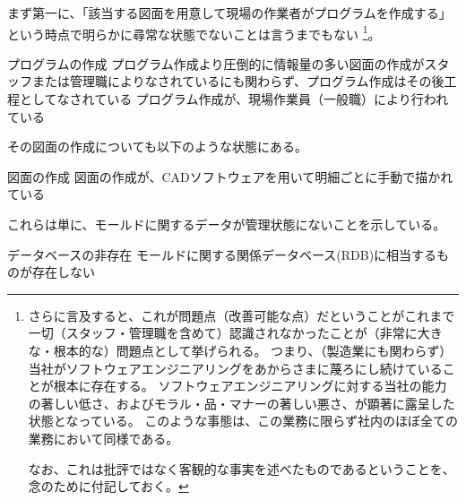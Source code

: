 まず第一に、「該当する図面を用意して現場の作業者がプログラムを作成する」という時点で明らかに尋常な状態でないことは言うまでもない
\footnote{さらに言及すると、これが問題点（改善可能な点）だということがこれまで一切（スタッフ・管理職を含めて）認識されなかったことが（非常に大きな・根本的な）問題点として挙げられる。
つまり、（製造業にも関わらず）当社がソフトウェアエンジニアリングをあからさまに蔑ろにし続けていることが根本に存在する。
ソフトウェアエンジニアリングに対する当社の能力の著しい低さ、およびモラル・品・マナーの著しい悪さ、が顕著に露呈した状態となっている。
このような事態は、この業務に限らず社内のほぼ全ての業務において同様である。

なお、これは批評ではなく客観的な事実を述べたものであるということを、念のために付記しておく。}。
\begin{Issues}{プログラムの作成}
プログラム作成より圧倒的に情報量の多い図面の作成がスタッフまたは管理職によりなされているにも関わらず、プログラム作成はその後工程としてなされている
\tcbline*
プログラム作成が、現場作業員（一般職）により行われている
\end{Issues}
その図面の作成についても以下のような状態にある。
\begin{Issues}{図面の作成}
図面の作成が、CADソフトウェアを用いて明細ごとに手動で描かれている
\end{Issues}
これらは単に、モールドに関するデータが管理状態にないことを示している。
\begin{Issues}{データベースの非存在}
モールドに関する関係データベース(RDB)に相当するものが存在しない
\end{Issues}






